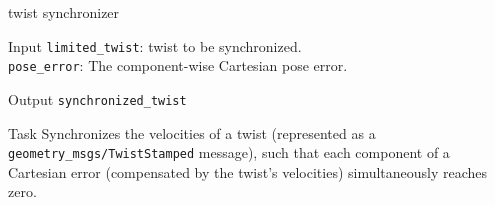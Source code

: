 \begin{frame}{twist synchronizer}
\begin{alertblock}{Input}
\texttt{limited\_twist}: twist to be synchronized.\\
\texttt{pose\_error}: The component-wise Cartesian pose error.
\end{alertblock}

\begin{alertblock}{Output}
\texttt{synchronized\_twist}
\end{alertblock}

\begin{alertblock}{Task}
Synchronizes the velocities of a twist (represented as a \texttt{geometry\_msgs/TwistStamped} message), such that each component of a Cartesian error (compensated by the twist's velocities) simultaneously reaches zero.
\end{alertblock}
\end{frame}

